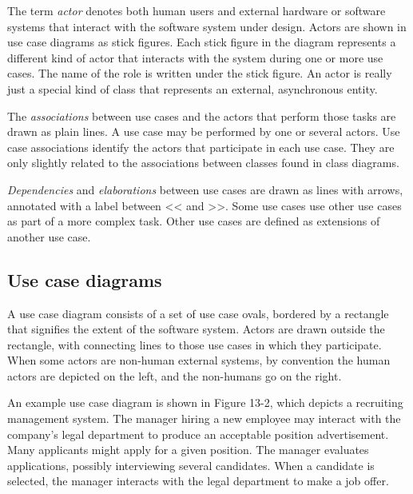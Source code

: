 The term \textit{actor} denotes both human users and
external hardware or software systems that interact with the software
system under design. Actors are shown in use case diagrams as stick
figures. Each stick figure in the diagram represents a different kind
of actor that interacts with the system during one or more use cases.
The name of the role is written under the stick figure. An
actor is really just a special kind of class that represents an
external, asynchronous entity.

The \textit{associations} between use cases
and the actors that perform those tasks are drawn as plain lines. A use
case may be performed by one or several
actors. Use case associations identify the actors that participate in
each use case. They are only slightly related to the associations
between classes found in class diagrams.

\textit{Dependencies} and \textit{elaborations} between use
cases are drawn as lines with arrows, annotated with a label between
{\textless\textless} and {\textgreater\textgreater}. Some use cases
use other use cases as
part of a more complex task. Other use cases are defined as extensions of
another use case.

\subsection*{Use case diagrams}

A use case diagram consists of a set of use case ovals, bordered by a rectangle
that signifies the extent of the software system. Actors are drawn outside the
rectangle, with connecting lines to those use cases in which they
participate. When some actors are non-human external systems, by convention the
human actors are depicted on the left, and the non-humans go on the right.

An example use case diagram is shown in Figure 13-2, which depicts a
recruiting management system. The manager hiring a new employee may
interact with the company's legal department to
produce an acceptable position advertisement. Many applicants might
apply for a given position. The manager evaluates applications,
possibly interviewing several candidates. When a candidate is selected,
the manager interacts with the legal department to make a job offer.

